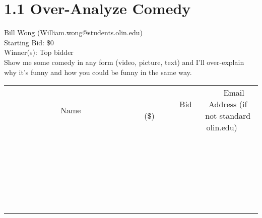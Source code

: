 \documentclass[11pt]{article}
\begin{document}
\section*{1.1 Over-Analyze Comedy}
Bill Wong (William.wong@students.olin.edu) \\
Starting Bid: \$0 \\
Winner(s): 
Top bidder \\
Show me some comedy in any form (video, picture, text) and I'll over-explain why it's funny and how you could be funny in the same way. \\[6ex]
\begin{tabular}{c c c}
~~~~~~~~~~~~~Name~~~~~~~~~~~~~ & ~~~~~~~~~Bid (\$)~~~~~~~~~ & ~~~Email Address (if not standard olin.edu)~~~ \\
 & & \\
\hline
 & & \\
\hline
 & & \\
\hline
 & & \\
\hline
 & & \\
\hline
 & & \\
\hline
 & & \\
\hline
 & & \\
\hline
 & & \\
\hline
 & & \\
\hline
 & & \\
\hline
 & & \\
\hline
 & & \\
\hline
 & & \\
\hline
 & & \\
\hline
 & & \\
\hline
 & & \\
\hline
 & & \\
\hline
 & & \\
\hline
 & & \\
\hline
 & & \\
\hline
 & & \\
\hline
 & & \\
\hline
 & & \\
\hline
 & & \\
\hline
 & & \\
\hline
\end{tabular}
\clearpage
\end{document}
